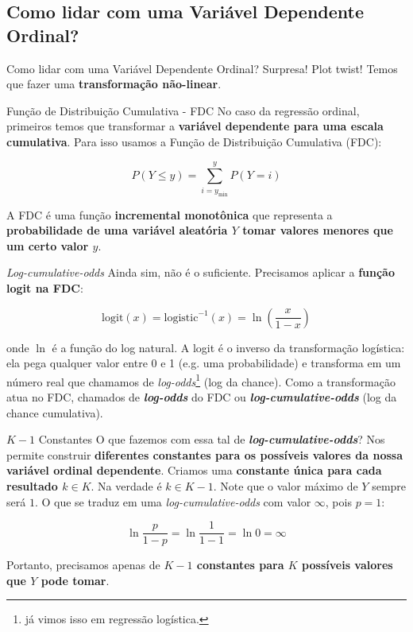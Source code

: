 \subsection{Como lidar com uma Variável Dependente Ordinal?}
\begin{frame}{Como lidar com uma Variável Dependente Ordinal?}
	Surpresa! Plot twist!
	\vfill
	Temos que fazer uma \textbf{transformação não-linear}.
\end{frame}

\begin{frame}{Função de Distribuição Cumulativa - FDC}
	No caso da regressão ordinal, primeiros temos que transformar a \textbf{variável
		dependente para uma escala cumulativa}.
	\vfill
	Para isso usamos a Função de Distribuição Cumulativa (FDC):

	$$P(Y \leq y) = \sum^y_{i=y_{\text{min}}} P(Y = i)$$

	A FDC é uma função \textbf{incremental monotônica} que representa a\textbf{ probabilidade
		de uma variável aleatória $Y$ tomar valores menores que um certo valor $y$}.
\end{frame}

\begin{frame}{\textit{Log-cumulative-odds}}
	Ainda sim, não é o suficiente.
	Precisamos aplicar a \textbf{função logit na FDC}:

	$$\mathrm{logit}(x) = \mathrm{logistic}^{-1}(x) = \ln\left(\frac{x}{1 -x}\right)$$

	onde $\ln$ é a função do log natural.
	\vfill
	A logit é o inverso da transformação logística: ela pega qualquer valor
	entre 0 e 1 (e.g. uma probabilidade) e transforma em um número real que
	chamamos de \textit{log-odds}\footnote{já vimos isso em regressão logística.}
	(log da chance).
	\vfill
	Como a transformação atua no FDC, chamados de \textbf{\textit{log-odds}} do FDC
	ou \textbf{\textit{log-cumulative-odds}} (log da chance cumulativa).
\end{frame}

\begin{frame}{$K-1$ Constantes}
	O que fazemos com essa tal de \textbf{\textit{log-cumulative-odds}}?
	\vfill
	Nos permite construir \textbf{diferentes constantes para os possíveis valores
		da nossa variável ordinal dependente}.
	Criamos uma \textbf{constante única para cada resultado $k \in K$}.
	\vfill
	Na verdade é $k \in K-1$. Note que o valor máximo de $Y$ sempre será $1$.
	O que se traduz em uma \textit{log-cumulative-odds} com valor $\infty$,
	pois $p=1$:

	$$\ln \frac{p}{1-p} = \ln \frac{1}{1-1} = \ln 0 = \infty$$

	Portanto, precisamos apenas de \textbf{$K-1$ constantes para $K$ possíveis valores
		que $Y$ pode tomar}.
\end{frame}

